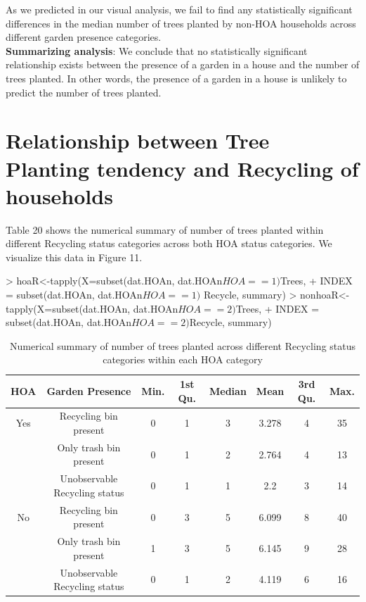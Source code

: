 \documentclass{article}
\begin{document}
As we predicted in our visual analysis, we fail to find any statistically significant differences in the median number of trees planted by non-HOA households across different garden presence categories.\\

\textbf{Summarizing analysis}: We conclude that no statistically significant relationship exists between the presence of a garden in a house and the number of trees planted. In other words, the presence of a garden in a house is unlikely to predict the number of trees planted.\\

\section*{Relationship between Tree Planting tendency and Recycling of households}

Table 20 shows the numerical summary of number of trees planted within different Recycling status categories across both HOA status categories. We visualize this data in Figure 11.

\begin{Schunk}
\begin{Sinput}
> hoaR<-tapply(X=subset(dat.HOAn, dat.HOAn$HOA==1)$Trees,
+     INDEX = subset(dat.HOAn, dat.HOAn$HOA==1)$ Recycle, summary)
> nonhoaR<- tapply(X=subset(dat.HOAn, dat.HOAn$HOA==2)$Trees,
+     INDEX = subset(dat.HOAn, dat.HOAn$HOA==2)$Recycle, summary)
\end{Sinput}
\end{Schunk}

\begin{table}[H]
  \centering
    \begin{tabular}{|c|c|c|c|c|c|c|c|}\hline
    HOA &
    Garden Presence
    & Min. & 1st Qu. & Median & Mean & 3rd Qu. & Max. \\\hline\hline
    
    Yes & Recycling bin present &
    0 & 1 & 
    3 & 
    3.278 & 4 & 35\\\hline\hline
    
    & Only trash bin present &
    0 & 1 & 
    2 & 
    2.764 & 4 & 13\\\hline\hline
    
    & Unobservable Recycling status &
    0 & 1 & 
    1 & 
    2.2 & 3 & 14\\\hline\hline
    
   No & Recycling bin present &
    0 & 3 & 
    5 & 
    6.099 & 8 & 40\\\hline\hline
    
    & Only trash bin present &
    1 & 3 & 
    5 & 
    6.145 & 9 & 28\\\hline\hline
    
    & Unobservable Recycling status &
    0 & 1 & 
    2 & 
    4.119 & 6 & 16\\\hline\hline
    
    \end{tabular}
    \caption{Numerical summary of number of trees planted across different Recycling status categories within each HOA category}
  \end{table}
\end{document}
